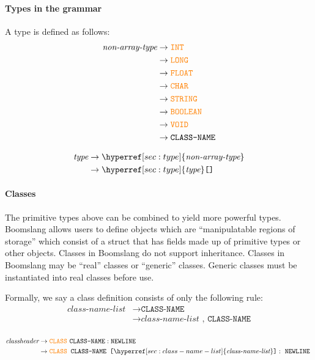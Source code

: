 \documentclass{article}
\begin{document}
\paragraph{Types in the grammar}
A type is defined as follows:
\label{sec:type}
\begin{align*}
    \textit{non-array-type} &\to \textcolor{orange}{\texttt{INT}} \\
    &\to \textcolor{orange}{\texttt{LONG}} \\
    &\to \textcolor{orange}{\texttt{FLOAT}} \\
    &\to \textcolor{orange}{\texttt{CHAR}} \\
    &\to \textcolor{orange}{\texttt{STRING}} \\
    &\to \textcolor{orange}{\texttt{BOOLEAN}} \\
    &\to \textcolor{orange}{\texttt{VOID}} \\
    &\to \texttt{CLASS-NAME} \\
\end{align*}

\begin{align*}
    \textit{type} &\to \hyperref[sec:type]{\textit{non-array-type}} \\
    &\to \hyperref[sec:type]{\textit{type}} \texttt{\lbrack \rbrack}
\end{align*}


\paragraph{Classes}
The primitive types above can be combined to yield more powerful types. Boomslang allows users to define objects which are ``manipulatable regions of storage'' which consist of a struct that has fields made up of primitive types or other objects. Classes in Boomslang do not support inheritance. Classes in Boomslang may be ``real'' classes or ``generic'' classes. Generic classes must be instantiated into real classes before use.

Formally, we say a class definition consists of only the following rule:
\label{sec:class-name-list}
\begin{align*}
    \textit{class-name-list} &\to \texttt{CLASS-NAME} \\
    &\to \hyperref[sec:class-name-list]{\textit{class-name-list}}\texttt{ , }  \texttt{CLASS-NAME} \\
\end{align*}

\label{sec:classheader}
\begin{align*}
    \textit{classheader} &\to \textcolor{orange}{\texttt{CLASS}} \text{ } \texttt{CLASS-NAME}: \texttt{NEWLINE} \text{ } \\
    &\to \textcolor{orange}{\texttt{CLASS}} \texttt{ } \texttt{CLASS-NAME} \texttt{ \lbrack} \hyperref[sec:class-name-list]{\textit{class-name-list}}\texttt{\rbrack}: \text{ } \texttt{NEWLINE} \text{ } \\
\end{align*}
\end{document}
